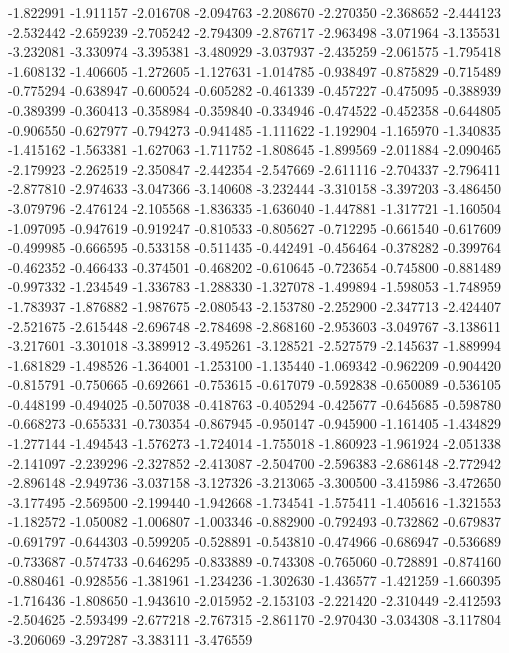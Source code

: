-1.822991
-1.911157
-2.016708
-2.094763
-2.208670
-2.270350
-2.368652
-2.444123
-2.532442
-2.659239
-2.705242
-2.794309
-2.876717
-2.963498
-3.071964
-3.135531
-3.232081
-3.330974
-3.395381
-3.480929
-3.037937
-2.435259
-2.061575
-1.795418
-1.608132
-1.406605
-1.272605
-1.127631
-1.014785
-0.938497
-0.875829
-0.715489
-0.775294
-0.638947
-0.600524
-0.605282
-0.461339
-0.457227
-0.475095
-0.388939
-0.389399
-0.360413
-0.358984
-0.359840
-0.334946
-0.474522
-0.452358
-0.644805
-0.906550
-0.627977
-0.794273
-0.941485
-1.111622
-1.192904
-1.165970
-1.340835
-1.415162
-1.563381
-1.627063
-1.711752
-1.808645
-1.899569
-2.011884
-2.090465
-2.179923
-2.262519
-2.350847
-2.442354
-2.547669
-2.611116
-2.704337
-2.796411
-2.877810
-2.974633
-3.047366
-3.140608
-3.232444
-3.310158
-3.397203
-3.486450
-3.079796
-2.476124
-2.105568
-1.836335
-1.636040
-1.447881
-1.317721
-1.160504
-1.097095
-0.947619
-0.919247
-0.810533
-0.805627
-0.712295
-0.661540
-0.617609
-0.499985
-0.666595
-0.533158
-0.511435
-0.442491
-0.456464
-0.378282
-0.399764
-0.462352
-0.466433
-0.374501
-0.468202
-0.610645
-0.723654
-0.745800
-0.881489
-0.997332
-1.234549
-1.336783
-1.288330
-1.327078
-1.499894
-1.598053
-1.748959
-1.783937
-1.876882
-1.987675
-2.080543
-2.153780
-2.252900
-2.347713
-2.424407
-2.521675
-2.615448
-2.696748
-2.784698
-2.868160
-2.953603
-3.049767
-3.138611
-3.217601
-3.301018
-3.389912
-3.495261
-3.128521
-2.527579
-2.145637
-1.889994
-1.681829
-1.498526
-1.364001
-1.253100
-1.135440
-1.069342
-0.962209
-0.904420
-0.815791
-0.750665
-0.692661
-0.753615
-0.617079
-0.592838
-0.650089
-0.536105
-0.448199
-0.494025
-0.507038
-0.418763
-0.405294
-0.425677
-0.645685
-0.598780
-0.668273
-0.655331
-0.730354
-0.867945
-0.950147
-0.945900
-1.161405
-1.434829
-1.277144
-1.494543
-1.576273
-1.724014
-1.755018
-1.860923
-1.961924
-2.051338
-2.141097
-2.239296
-2.327852
-2.413087
-2.504700
-2.596383
-2.686148
-2.772942
-2.896148
-2.949736
-3.037158
-3.127326
-3.213065
-3.300500
-3.415986
-3.472650
-3.177495
-2.569500
-2.199440
-1.942668
-1.734541
-1.575411
-1.405616
-1.321553
-1.182572
-1.050082
-1.006807
-1.003346
-0.882900
-0.792493
-0.732862
-0.679837
-0.691797
-0.644303
-0.599205
-0.528891
-0.543810
-0.474966
-0.686947
-0.536689
-0.733687
-0.574733
-0.646295
-0.833889
-0.743308
-0.765060
-0.728891
-0.874160
-0.880461
-0.928556
-1.381961
-1.234236
-1.302630
-1.436577
-1.421259
-1.660395
-1.716436
-1.808650
-1.943610
-2.015952
-2.153103
-2.221420
-2.310449
-2.412593
-2.504625
-2.593499
-2.677218
-2.767315
-2.861170
-2.970430
-3.034308
-3.117804
-3.206069
-3.297287
-3.383111
-3.476559
